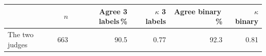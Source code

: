 \begin{tabular}{@{}lrrrrr@{}}
\toprule
 & $n$ & Agree 3 labels\,\% & $\kappa$ 3 labels & Agree binary\,\% & $\kappa$ binary \\
\midrule
The two judges & 663 & 90.5 & 0.77 & 92.3 & 0.81 \\
\bottomrule
\end{tabular}

